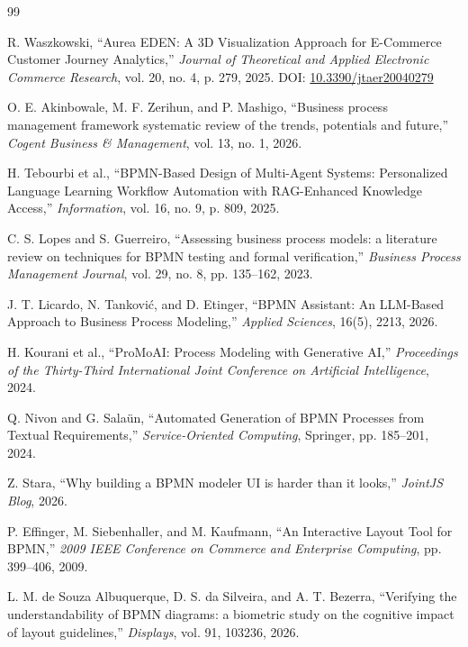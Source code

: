 \documentclass{article}
\begin{document}
	\begin{thebibliography}{99}
		
		R. Waszkowski, ``Aurea EDEN: A 3D Visualization Approach for E-Commerce Customer Journey Analytics,'' \emph{Journal of Theoretical and Applied Electronic Commerce Research}, vol. 20, no. 4, p. 279, 2025. DOI: \href{https://doi.org/10.3390/jtaer20040279}{10.3390/jtaer20040279}
		
		O. E. Akinbowale, M. F. Zerihun, and P. Mashigo, ``Business process management framework systematic review of the trends, potentials and future,'' \emph{Cogent Business \& Management}, vol. 13, no. 1, 2026.
		
		H. Tebourbi et al., ``BPMN-Based Design of Multi-Agent Systems: Personalized Language Learning Workflow Automation with RAG-Enhanced Knowledge Access,'' \emph{Information}, vol. 16, no. 9, p. 809, 2025.
		
		C. S. Lopes and S. Guerreiro, ``Assessing business process models: a literature review on techniques for BPMN testing and formal verification,'' \emph{Business Process Management Journal}, vol. 29, no. 8, pp. 135--162, 2023.
		
		J. T. Licardo, N. Tankovi\'c, and D. Etinger, ``BPMN Assistant: An LLM-Based Approach to Business Process Modeling,'' \emph{Applied Sciences}, 16(5), 2213, 2026.
		
		H. Kourani et al., ``ProMoAI: Process Modeling with Generative AI,'' \emph{Proceedings of the Thirty-Third International Joint Conference on Artificial Intelligence}, 2024.
		
		Q. Nivon and G. Sala\"un, ``Automated Generation of BPMN Processes from Textual Requirements,'' \emph{Service-Oriented Computing}, Springer, pp. 185--201, 2024.
		
		Z. Stara, ``Why building a BPMN modeler UI is harder than it looks,'' \emph{JointJS Blog}, 2026.
		
		P. Effinger, M. Siebenhaller, and M. Kaufmann, ``An Interactive Layout Tool for BPMN,'' \emph{2009 IEEE Conference on Commerce and Enterprise Computing}, pp. 399--406, 2009.
		
		L. M. de Souza Albuquerque, D. S. da Silveira, and A. T. Bezerra, ``Verifying the understandability of BPMN diagrams: a biometric study on the cognitive impact of layout guidelines,'' \emph{Displays}, vol. 91, 103236, 2026.
		

\end{thebibliography}
\end{document}
